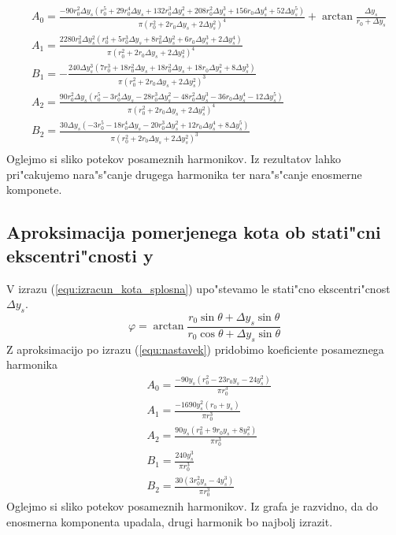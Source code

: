 \begin{eqnarray}
&A_0=\frac{-90 r_0^2  \Delta y_s (r_0^5+29 r_0^4 \Delta y_s+132 r_0^3  \Delta y_s^2+208 r_0 ^2  \Delta y_s^3+156 r_0  \Delta y_s^4+52 \Delta y_s^5)}{\pi (r_0^2+2 r_0 \Delta y_s+2 \Delta y_s^2)^4}+\arctan \frac{ \Delta y_s}{r_0+ \Delta y_s}\\
&A_1=\frac{2280 r_0^2  \Delta y_s^2(r_0^4+5 r_0^3  \Delta y_s+8 r_0^2  \Delta y_s^2+6 r_0  \Delta y_s^3+2 \Delta y_s^4)}{\pi(r_0^2+2 r_0 \Delta y_s+2 \Delta y_s^2)^4}\\
&B_1=-\frac{240 \Delta y_s^3(7r_0^3+18 r_0^2  \Delta y_s+18 r_0^2  \Delta y_s+18 r_0  \Delta y_s^2+8 \Delta y_s^3)}{\pi(r_0^2+2 r_0 \Delta y_s+2 \Delta y_s^2)^3}\\
&A_2=\frac{90 r_0^2  \Delta y_s (r_0^5-3 r_0^4 \Delta y_s-28 r_0^3  \Delta y_s^2-48r_0 ^2  \Delta y_s^3-36 r_0  \Delta y_s^4-12 \Delta y_s^5)}{\pi(r_0^2+2 r_0 \Delta y_s+2 \Delta y_s^2)^4}\\
&B_2=\frac{30 \Delta y_s (-3r_0^5-18 r_0^4 \Delta y_s-20 r_0^3  \Delta y_s^2 +12 r_0  \Delta y_s^4+8 \Delta y_s^5)}{\pi(r_0^2+2 r_0 \Delta y_s+2 \Delta y_s^2)^3}\\
\end{eqnarray}
Oglejmo si sliko potekov posameznih harmonikov.
Iz rezultatov lahko pri"cakujemo nara"s"canje drugega harmonika ter nara"s"canje enosmerne komponete.
\subsection{Aproksimacija pomerjenega kota ob stati"cni ekscentri"cnosti y}
V izrazu (\ref{equ:izracun_kota_splosna}) upo"stevamo le stati"cno ekscentri"cnost $\Delta y_s$.
\begin{equation}
\label{equ:izracun_kota_ys}
\varphi=\arctan \frac{r_0 \sin\theta +\Delta y_s \sin\theta}{r_0 \cos\theta +\Delta y_s \sin\theta}
\end{equation}
Z aproksimacijo po izrazu (\ref{equ:nastavek}) pridobimo koeficiente posameznega harmonika
\begin{eqnarray}
&A_0=\frac{-90 y_s (r_0^2-23r_0 y_s-24y _s^2)}{\pi r_0^3}\\
&A_1=\frac{-1690 y_s^2(r_0+y_s)}{\pi r_0^3}\\
&A_2=\frac{90 y_s(r_0^2+9r_0y_s+8y_s^2)}{\pi r_0^3}\\
&B_1=\frac{240 y_s^3}{\pi r_0^3}\\
&B_2=\frac{30 (3 r_0^2y_s-4 y_s^3)}{\pi r_0^3}
\end{eqnarray}
Oglejmo si sliko potekov posameznih harmonikov.
Iz grafa je razvidno, da do enosmerna komponenta upadala, drugi harmonik bo najbolj izrazit.
